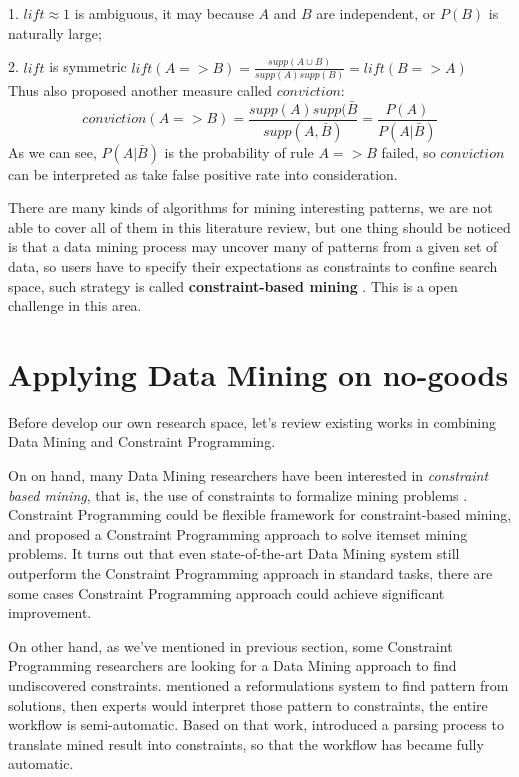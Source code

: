 \documentclass{article}
\begin{document}
1. $lift \approx 1$ is ambiguous, it may because $A$ and $B$ are independent, or $P(B)$ is naturally large;

2. $lift$ is symmetric $lift(A => B) = \frac{supp(A \cup B)}{supp(A)supp(B)} = lift(B => A)$\\
Thus \cite{brin1997dynamic} also proposed another measure called $conviction$:
$$
    conviction(A=>B) = \frac{supp(A) supp(\bar{B}}{supp(A, \bar{B})} = \frac{P(A)}{P(A|\bar{B})}
$$
As we can see, $P(A|\bar{B})$ is the probability of rule $A=>B$ failed, so $conviction$ can be interpreted as take false positive rate into consideration.

There are many kinds of algorithms for mining interesting patterns, we are not able to cover all of them in this literature review, but one thing should be noticed is that a data mining process may uncover many of patterns from a given set of data, so users have to specify their expectations as constraints to confine search space, such strategy is called \textbf{constraint-based mining} \cite{han2011data}. This is a open challenge in this area.

\section{Applying Data Mining on no-goods} \label{cpdm}

Before develop our own research space, let's review existing works in combining Data Mining and Constraint Programming.

On on hand, many Data Mining researchers have been interested in \textit{constraint based mining}, that is, the use of constraints to formalize mining problems \cite{de2011constraint}. Constraint Programming could be flexible framework for constraint-based mining\cite{de2008constraint}, and \cite{guns2011itemset} proposed a Constraint Programming approach to solve itemset mining problems. It turns out that even state-of-the-art Data Mining system still outperform the Constraint Programming approach in standard tasks, there are some cases Constraint Programming approach could achieve significant improvement.

On other hand, as we've mentioned in previous section, some Constraint Programming researchers are looking for a Data Mining approach to find undiscovered constraints. \cite{colton2001constraint} mentioned a reformulations system to find pattern from solutions, then experts would interpret those pattern to constraints, the entire workflow is semi-automatic. Based on that work, \cite{charnley2006automatic} introduced a parsing process to translate mined result into constraints, so that the workflow has became fully automatic.
\end{document}
